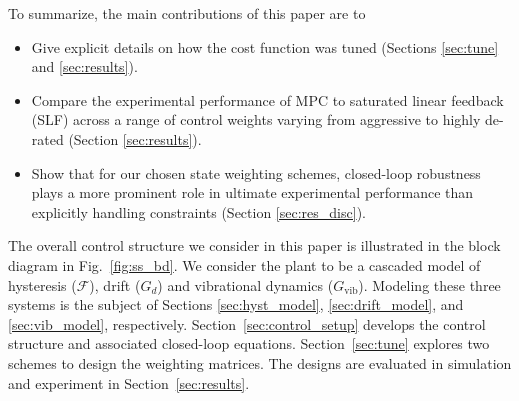 \documentclass[twocolumn,twoside]{IEEEtran}
\newcommand{\Gv}{\ensuremath{G_{\text{vib}}}\xspace}
\begin{document}
To summarize, the main contributions of this paper are to
\begin{itemize}
\item Give explicit details on how the cost function was tuned (Sections \ref{sec:tune} and \ref{sec:results}).
\item Compare the experimental performance of MPC to saturated linear feedback (SLF) across a range of control weights varying from aggressive to highly de-rated (Section \ref{sec:results}).
\item Show that for our chosen state weighting schemes, closed-loop robustness plays a more prominent role in ultimate experimental performance than explicitly handling constraints (Section \ref{sec:res_disc}).
\end{itemize}

The overall control structure we consider in this paper is illustrated in the block diagram in Fig.~\ref{fig:ss_bd}. We consider the plant to be a cascaded model of hysteresis ($\mathcal{F}$), drift ($G_d$) and vibrational dynamics ($\Gv$). Modeling these three systems is the subject of Sections \ref{sec:hyst_model}, \ref{sec:drift_model}, and \ref{sec:vib_model}, respectively. Section~\ref{sec:control_setup} develops the control structure and associated closed-loop equations. Section~\ref{sec:tune} explores two schemes to design the weighting matrices. The designs are evaluated in simulation and experiment in Section~\ref{sec:results}.

\end{document}
